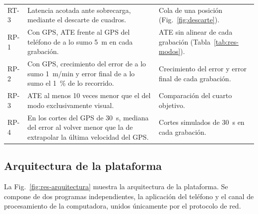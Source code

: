 \begin{table}[H]
\begin{tabularx}{\textwidth}{@{}>{\raggedright\arraybackslash}p{1.1cm}>{\raggedright\arraybackslash}X>{\raggedright\arraybackslash}p{4.6cm}@{}}
RT-3 & Latencia acotada ante sobrecarga, mediante el descarte de cuadros. & Cola de una posición (Fig.~\ref{fig:descarte}). \\
\addlinespace
RP-1 & Con GPS, ATE frente al GPS del teléfono de a lo sumo 5~m en cada grabación. & ATE sin alinear de cada grabación (Tabla~\ref{tab:res-modos}). \\
RP-2 & Con GPS, crecimiento del error de a lo sumo 1~m/min y error final de a lo sumo el 1~\% de lo recorrido. & Crecimiento del error y error final de cada grabación. \\
RP-3 & ATE al menos 10 veces menor que el del modo exclusivamente visual. & Comparación del cuarto objetivo. \\
RP-4 & En los cortes del GPS de 30~s, mediana del error al volver menor que la de extrapolar la última velocidad del GPS. & Cortes simulados de 30~s en cada grabación. \\
\bottomrule
\end{tabularx}
\end{table}

\subsection{Arquitectura de la plataforma}
\label{sec:res-arquitectura}
%

La Fig.~\ref{fig:res-arquitectura} muestra la arquitectura de la plataforma.
Se compone de dos programas independientes, la aplicación del teléfono y el canal de procesamiento de la computadora, unidos únicamente por el protocolo de red.

